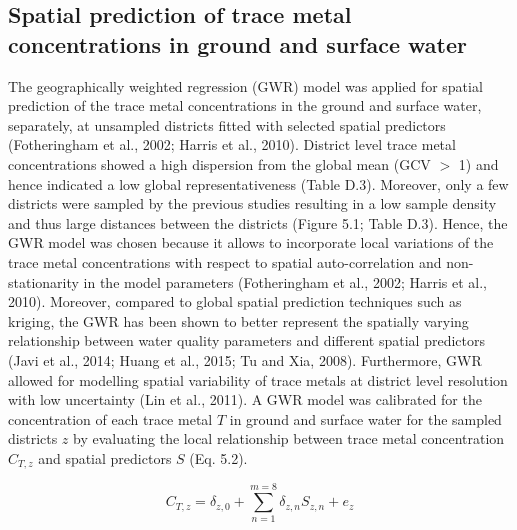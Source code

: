 \subsection{Spatial prediction of trace metal concentrations in ground and surface water}
\label{Spatial prediction of trace metal concentrations in ground and surface water}

The geographically weighted regression (GWR) model was applied for spatial prediction of the trace metal concentrations in the ground and surface water, separately, at unsampled districts fitted with selected spatial predictors (Fotheringham et al., 2002; Harris et al., 2010). District level trace metal concentrations showed a high dispersion from the global mean (GCV $>$ 1) and hence indicated a low global representativeness (Table D.3). Moreover, only a few districts were sampled by the previous studies resulting in a low sample density and thus large distances between the districts (Figure 5.1; Table D.3). Hence, the GWR model was chosen because it allows to incorporate local variations of the trace metal concentrations with respect to spatial auto-correlation and non-stationarity in the model parameters (Fotheringham et al., 2002; Harris et al., 2010). Moreover, compared to global spatial prediction techniques such as kriging, the GWR has been shown to better represent the spatially varying relationship between water quality parameters and different spatial predictors (Javi et al., 2014; Huang et al., 2015; Tu and Xia, 2008). Furthermore, GWR allowed for modelling spatial variability of trace metals at district level resolution with low uncertainty (Lin et al., 2011). A GWR model was calibrated for the concentration of each trace metal $T$ in ground and surface water for the sampled districts $z$ by evaluating the local relationship between trace metal concentration $C_{T,z}$ and spatial predictors $S$ (Eq. 5.2).

\begin{equation}
C_{T,z}=\delta_{z,0}+\displaystyle\sum_{n=1}^{m=8}\delta_{z,n}S_{z,n}+e_z
\end{equation}

